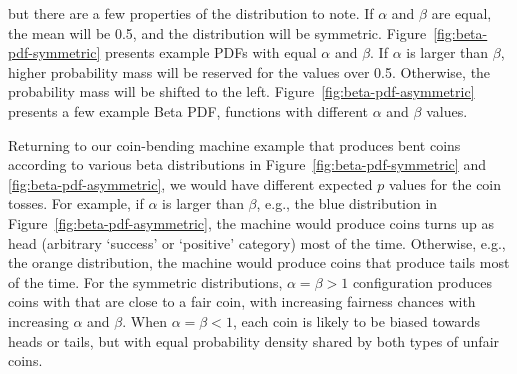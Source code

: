 but there are a few properties of the distribution to note.
If $\alpha$ and $\beta$ are equal,
the mean will be \num{0.5}, and the distribution will be symmetric.
Figure~\ref{fig:beta-pdf-symmetric} presents example PDFs
with equal $\alpha$ and $\beta$.
If $\alpha$ is larger than $\beta$,
higher probability mass will be reserved for the values over \num{0.5}.
Otherwise, 
the probability mass will be shifted to the left.
Figure~\ref{fig:beta-pdf-asymmetric} presents a few example Beta PDF,
functions with different $\alpha$ and $\beta$ values.
\begin{marginfigure}
  \caption{\label{fig:beta-pdf-asymmetric}%
    Example asymmetric beta PDFs: 
    $\alpha = 5$, $\beta = 2$ (blue),
    $\alpha = 2$, $\beta = 5$ (orange),
    $\alpha = 1$, $\beta = 0.5$ (purple),
    $\alpha = 1$, $\beta = 2$ (brown).
  }
\end{marginfigure}

Returning to our coin-bending machine example that produces bent coins
according to various beta distributions
in Figure~\ref{fig:beta-pdf-symmetric} and \ref{fig:beta-pdf-asymmetric},
we would have different expected $p$ values for the coin tosses.
For example,
if $\alpha$ is larger than $\beta$,
e.g.,
the blue distribution in Figure~\ref{fig:beta-pdf-asymmetric},
the machine would produce coins turns up as head
(arbitrary `success' or `positive' category) most of the time.
Otherwise, e.g.,  the orange distribution,
the machine would produce coins that produce tails most of the time.
For the symmetric distributions, 
$\alpha=\beta > 1$ configuration produces
coins with that are close to a fair coin,
with increasing fairness chances with increasing $\alpha$ and $\beta$.
When $\alpha=\beta < 1$,
each coin is likely to be biased towards heads or tails,
but with equal probability density shared by both types of unfair coins.

